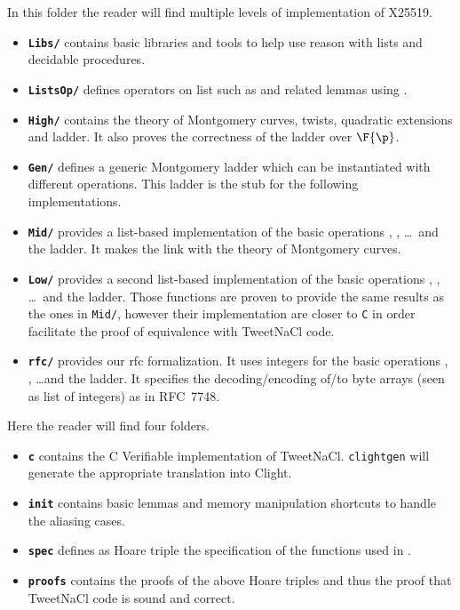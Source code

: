 In this folder the reader will find multiple levels of implementation of X25519.
\begin{itemize}
  \item \textbf{\texttt{Libs/}} contains basic libraries and tools to help use
  reason with lists and decidable procedures.
  \item \textbf{\texttt{ListsOp/}} defines operators on list such as
   and related lemmas using \eg {}.
  \item \textbf{\texttt{High/}} contains the theory of Montgomery curves,
  twists, quadratic extensions and ladder.
  It also proves the correctness of the ladder over $\F{\p}$.
  \item \textbf{\texttt{Gen/}} defines a generic Montgomery ladder which can be
  instantiated with different operations. This ladder is the stub for the
  following implementations.
  \item \textbf{\texttt{Mid/}} provides a list-based implementation of the
  basic operations , ,  \ldots~and the ladder. It
  makes the link with the theory of Montgomery curves.
  \item \textbf{\texttt{Low/}} provides a second list-based implementation of
  the basic operations , ,  \ldots~and the ladder.
  Those functions are proven to provide the same results as the ones in
  \texttt{Mid/}, however their implementation are closer to \texttt{C} in order
  facilitate the proof of equivalence with TweetNaCl code.
  \item \textbf{\texttt{rfc/}} provides our rfc formalization.
  It uses integers for the basic operations , , 
  \ldots and the ladder. It specifies the decoding/encoding of/to byte
  arrays (seen as list of integers) as in RFC~7748.
\end{itemize}

Here the reader will find four folders.
\begin{itemize}
  \item \textbf{\texttt{c}} contains the C Verifiable implementation of TweetNaCl.
  \texttt{clightgen} will generate the appropriate translation into Clight.
  \item \textbf{\texttt{init}} contains basic lemmas and memory manipulation
  shortcuts to handle the aliasing cases.
  \item \textbf{\texttt{spec}} defines as Hoare triple the specification of the
  functions used in .
  \item \textbf{\texttt{proofs}} contains the proofs of the above Hoare triples
  and thus the proof that TweetNaCl code is sound and correct.
\end{itemize}
